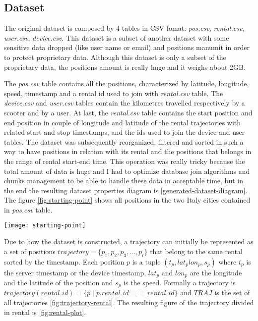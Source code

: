 \subsection{Dataset}

The original dataset is composed by 4 tables in CSV fomat: \textit{pos.csv}, \textit{rental.csv}, \textit{user.csv}, \textit{device.csv}. This dataset is a subset of another dataset with some sensitive data dropped (like user name or email) and positions manumit in order to protect proprietary data. Although this dataset is only a subset of the proprietary data, the positions amount is really huge and it weighs about 2GB. 

The \textit{pos.csv} table contains all the positions, characterized by latitude, longitude, speed, timestamp and a rental id used to join with \textit{rental.csv} table. The \textit{device.csv} and \textit{user.csv} tables contain the kilometres travelled respectively by a scooter and by a user. At last, the \textit{rental.csv} table contains the start position and end position in couple of longitude and latitude of the rental trajectories with related start and stop timestamps, and the ids used to join the device and user tables. The dataset was subsequently reorganized, filtered and sorted in such a way to have positions in relation with its rental and the positions that belongs in the range of rental start-end time. This operation was really tricky because the total amount of data is huge and I had to optimize database join algorithms and chunks management to be able to handle these data in acceptable time, but in the end the resulting dataset properties diagram is \ref{generated-dataset-diagram}. The figure \ref{fig:starting-point} shows all positions in the two Italy cities contained in \textit{pos.csv} table.

\begin{figure*}[bt]
	\centering
	\texttt{[image: starting-point]}
	\caption{Trajectories without clustering in 2 Italy cities}
	\label{fig:starting-point}
\end{figure*}

Due to how the dataset is constructed, a trajectory can initially be represented as a set of positions $trajectory = \{p_1, p_2, p_3, ..., p_t\}$ that belong to the same rental sorted by the timestamp. Each position $p$ is a tuple $(t_p, lat_p lon_p, s_p)$ where $t_p$ is the server timestamp or the device timestamp, $lat_p$ and $lon_p$ are the longitude and the latitude of the position and $s_p$ is the speed. Formally a trajectory is $trajectory(rental\_id) = \{ p \mid p.rental\_id == rental\_id  \}$ and $TRAJ$ is the set of all trajectories \ref{fig:trajectory-rental}. The resulting figure of the trajectory divided in rental is \ref{fig:rental-plot}.

